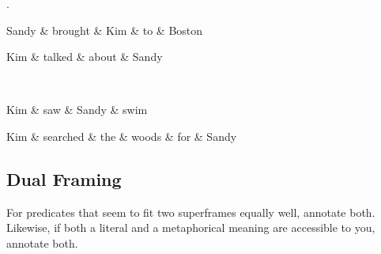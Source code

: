 \documentclass[a4paper]{article}
\begin{document}
\ex.
\begin{dependency}
    \begin{deptext}
    Sandy \& brought \& Kim \& to \& Boston \\
    \end{deptext}
\end{dependency}
\begin{dependency}
    \begin{deptext}
    Kim \& talked \& about \& Sandy \\
    \end{deptext}
\end{dependency}\\
\begin{dependency}
    \begin{deptext}
    Kim \& saw \& Sandy \& swim \\
    \end{deptext}
\end{dependency}
\begin{dependency}
    \begin{deptext}
    Kim \& searched \& the \& woods \& for \& Sandy \\
    \end{deptext}
\end{dependency}

\subsection{Dual Framing}

For predicates that seem to fit two superframes equally well, annotate both. Likewise, if both a literal and a metaphorical meaning are accessible to you, annotate both.
\end{document}
